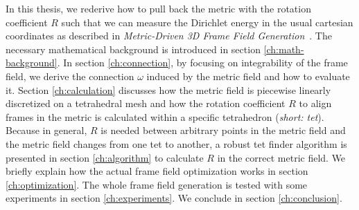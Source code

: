 \documentclass[../thesis.tex]{subfiles}
\begin{document}
In this thesis, we rederive how to pull back the metric with the rotation coefficient $R$ such that we can measure
the Dirichlet energy in the usual cartesian coordinates as described in \emph{Metric-Driven 3D Frame Field Generation}~\cite{Fang23}.
The necessary mathematical background is introduced in section \ref{ch:math-background}.
In section \ref{ch:connection}, by focusing on integrability of the frame field,
we derive the connection $\omega$ induced by the metric field and how to evaluate it.
Section \ref{ch:calculation} discusses how the metric field is piecewise linearly discretized on a tetrahedral
mesh and how the rotation coefficient $R$ to align frames in the metric is calculated within a specific tetrahedron (\emph{short: tet}).
Because in general, $R$ is needed between arbitrary points in the metric field and the metric field
changes from one tet to another, a robust tet finder algorithm is
presented in section \ref{ch:algorithm} to calculate $R$ in the correct metric field.
We briefly explain how the actual frame field optimization works in section \ref{ch:optimization}.
The whole frame field generation is tested with some experiments in section \ref{ch:experiments}.
We conclude in section \ref{ch:conclusion}.
\end{document}
